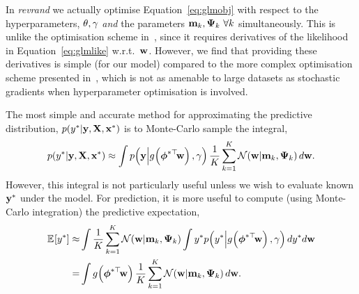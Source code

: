 \documentclass[11pt, oneside]{article}
\begin{document}
In \emph{revrand} we actually optimise Equation~\eqref{eq:glmobj} with respect
to the hyperparameters, $\theta, \gamma$ \emph{and} the parameters $\mathbf{m}_k,
\boldsymbol{\Psi}_k~\forall k$ simultaneously. This is unlike the optimisation scheme 
in~\cite{gershman2012}, since it requires  derivatives of the
likelihood in Equation~\eqref{eq:glmlike} w.r.t.\ $\mathbf{w}$. However, we find
that providing these derivatives is simple (for our model) compared to the more
complex optimisation scheme presented in~\cite{gershman2012}, which is not as
amenable to large datasets as stochastic gradients when hyperparameter 
optimisation is involved.

The most simple and accurate method for approximating the predictive
distribution, $p\!\left({y^{*}}\middle\vert{\ensuremath{\mathbf{y}}, \ensuremath{\mathbf{X}}, \ensuremath{\mathbf{x}}\ensuremath{^{*}}}\right)$ is to Monte-Carlo
sample the integral,
\begin{equation}
    p\!\left({y^{*}}\middle\vert{\ensuremath{\mathbf{y}}, \ensuremath{\mathbf{X}}, \ensuremath{\mathbf{x}}\ensuremath{^{*}}}\right) \approx
    \int p\!\left({\mathbf{y}}\middle\vert{\ensuremath{{g}_{}\!\left({{\boldsymbol\phi^{*\top}\!\mathbf{w}}}\right)}, \ensuremath{\gamma}}\right)
    \frac{1}{K} \sum^K_{k=1} \mathcal{N}\!\left({\mathbf{w}}\middle\vert{\ensuremath{\mathbf{m}}_k, \ensuremath{\boldsymbol{\Psi}}_k}\right) d \mathbf{w}.
    \label{eq:glppred}
\end{equation}
However, this integral is not particularly useful unless we wish to evaluate
known $\mathbf{y}^{*}$ under the model. For prediction, it is more useful to
compute (using Monte-Carlo integration) the predictive expectation, 
\begin{align}
    \expece{}{\targs\test} \approx&
    \int \frac{1}{K} \sum^K_{k=1} \gausC{\weights}{\pomean_k, \dpocov_k}
    \int \targs\test \probC{\targs\test}{\activ{\feats\testT\weights}, \lparam}
    d \targs\test d \weights
    \nonumber\\
    =& \int \activ{\feats\testT\weights}
    \frac{1}{K} \sum^K_{k=1} \gausC{\weights}{\pomean_k, \dpocov_k}
    d \weights.
    \label{eq:glmexpec}
\end{align}
\end{document}
